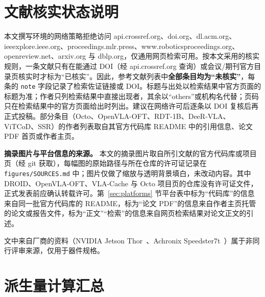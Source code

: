 \documentclass[a4paper,10.5pt]{ctexart}
\begin{document}
\appendix

\section{文献核实状态说明}\label{app:verify}

本文撰写环境的网络策略拒绝访问 api.crossref.org、doi.org、dl.acm.org、ieeexplore.ieee.org、proceedings.mlr.press、www.roboticsproceedings.org、openreview.net、arxiv.org 与 dblp.org，仅通用网页检索可用。按本文采用的核实规则，一条文献只有在能通过 DOI（经 api.crossref.org 查询）或会议/期刊官方目录页核实时才标为“已核实”。因此，参考文献列表中\textbf{全部条目均为“未核实”}，每条的 \texttt{note} 字段记录了检索佐证链接或 DOI。标题与出处以检索结果中官方页面的标题为准；作者只列检索结果中直接出现者，其余以“others”或机构名代替；页码只在检索结果中的官方页面给出时列出。建议在网络许可后逐条以 DOI 复核后再正式投稿。部分条目（Octo、OpenVLA-OFT、RDT-1B、DeeR-VLA、ViTCoD、SSR）的作者列表取自其官方代码库 README 中的引用信息、论文 PDF 首页或作者主页。

\textbf{摘录图片与平台信息的来源。} 本文的摘录图片取自所引文献的官方代码库或项目页（经 git 获取），每幅图的原始路径与所在仓库的许可证记录在 \texttt{figures/SOURCES.md} 中；图片仅做了缩放与透明背景填白，未改动内容。其中 DROID、OpenVLA-OFT、VLA-Cache 与 Octo 项目页的仓库没有许可证文件，正式发表前应确认转载许可。第~\ref{sec:platforms} 节平台表中标为“代码库”的信息来自同一批官方代码库的 README，标为“论文 PDF”的信息来自作者主页托管的论文或报告文件，标为“正文”“检索”的信息来自网页检索结果对论文正文的引述。

文中来自厂商的资料（NVIDIA Jetson Thor~\cite{thor}、Achronix Speedster7t~\cite{achronix}）属于非同行评审来源，仅用于器件规格。

\section{派生量计算汇总}\label{app:derived}
\end{document}
